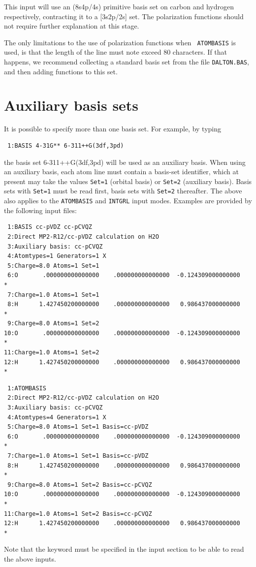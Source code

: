 This input will use an (8s4p/4s) primitive basis set on carbon and
hydrogen respectively, contracting it to a [3s2p/2s] set. The
polarization functions should not require further explanation at this
stage.

The only limitations to the use of polarization functions when {\tt
ATOMBASIS} is used, is that the length of the line must note exceed 80
characters. If that happens, we recommend collecting a standard basis set
from the file \verb|DALTON.BAS|, and then adding
functions to this set.

\section{Auxiliary basis sets}
\label{sec:r12aux}

It is possible to specify more than one basis set. For example, by typing
\begin{verbatim}
 1:BASIS 4-31G** 6-311++G(3df,3pd)
\end{verbatim}
the basis set 6-311++G(3df,3pd) will be used as an auxiliary basis.
When using an auxiliary basis, each atom line must contain a basis-set
identifier, which at present may take the values \verb|Set=1| (orbital basis) or 
\verb|Set=2| (auxiliary basis). Basis sets with \verb|Set=1| must be read first,
basis sets with \verb|Set=2| thereafter.
The above also applies to the \verb|ATOMBASIS| and \verb|INTGRL| input modes.
Examples are provided by the following input files:
\begin{verbatim}
 1:BASIS cc-pVDZ cc-pCVQZ
 2:Direct MP2-R12/cc-pVDZ calculation on H2O
 3:Auxiliary basis: cc-pCVQZ
 4:Atomtypes=1 Generators=1 X
 5:Charge=8.0 Atoms=1 Set=1
 6:O       .000000000000000    .000000000000000  -0.124309000000000       *
 7:Charge=1.0 Atoms=1 Set=1
 8:H      1.427450200000000    .000000000000000   0.986437000000000       *
 9:Charge=8.0 Atoms=1 Set=2
10:O       .000000000000000    .000000000000000  -0.124309000000000       *
11:Charge=1.0 Atoms=1 Set=2
12:H      1.427450200000000    .000000000000000   0.986437000000000       *
\end{verbatim}
\begin{verbatim}
 1:ATOMBASIS
 2:Direct MP2-R12/cc-pVDZ calculation on H2O
 3:Auxiliary basis: cc-pCVQZ
 4:Atomtypes=4 Generators=1 X
 5:Charge=8.0 Atoms=1 Set=1 Basis=cc-pVDZ
 6:O       .000000000000000    .000000000000000  -0.124309000000000       *
 7:Charge=1.0 Atoms=1 Set=1 Basis=cc-pVDZ
 8:H      1.427450200000000    .000000000000000   0.986437000000000       *
 9:Charge=8.0 Atoms=1 Set=2 Basis=cc-pCVQZ
10:O       .000000000000000    .000000000000000  -0.124309000000000       *
11:Charge=1.0 Atoms=1 Set=2 Basis=cc-pCVQZ
12:H      1.427450200000000    .000000000000000   0.986437000000000       *
\end{verbatim}
Note that the keyword  must be specified in the 
 input section to be able to read the above inputs.

